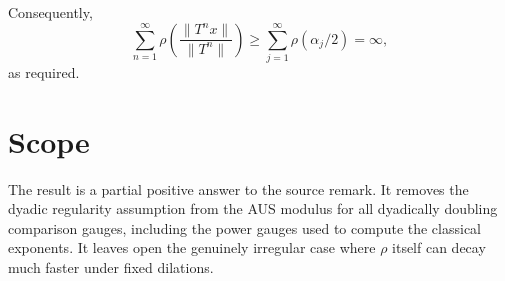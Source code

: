 \documentclass[11pt]{article}
\begin{document}
Consequently,
\[
  \sum_{n=1}^{\infty}\rho\!\left(\frac{\|T^n x\|}{\|T^n\|}\right)
  \ge
  \sum_{j=1}^{\infty}\rho(\alpha_j/2)
  =\infty,
\]
as required.

\section*{Scope}

The result is a partial positive answer to the source remark.  It removes
the dyadic regularity assumption from the AUS modulus for all dyadically
doubling comparison gauges, including the power gauges used to compute the
classical exponents.  It leaves open the genuinely irregular case where
\(\rho\) itself can decay much faster under fixed dilations.
\end{document}
